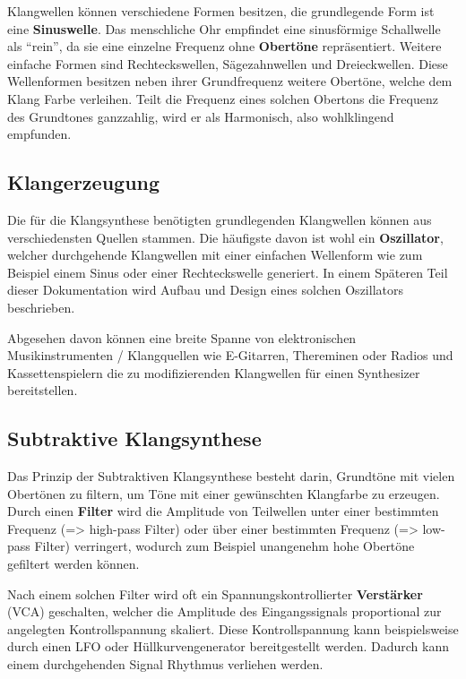 Klangwellen können verschiedene Formen besitzen, die grundlegende Form ist eine \textbf{Sinuswelle}. Das menschliche Ohr empfindet eine sinusförmige Schallwelle als "`rein"', da sie eine einzelne Frequenz ohne \textbf{Obertöne} repräsentiert. Weitere einfache Formen sind Rechteckswellen, Sägezahnwellen und Dreieckwellen. Diese Wellenformen besitzen neben ihrer Grundfrequenz weitere Obertöne, welche dem Klang Farbe verleihen. Teilt die Frequenz eines solchen Obertons die Frequenz des Grundtones ganzzahlig, wird er als Harmonisch, also wohlklingend empfunden.

\subsection{Klangerzeugung}
\label{sec:orgbae9342}
Die für die Klangsynthese benötigten grundlegenden Klangwellen können aus verschiedensten Quellen stammen. Die häufigste davon ist wohl ein \textbf{Oszillator}, welcher durchgehende Klangwellen mit einer einfachen Wellenform wie zum Beispiel einem Sinus oder einer Rechteckswelle generiert. In einem Späteren Teil dieser Dokumentation wird Aufbau und Design eines solchen Oszillators beschrieben.

Abgesehen davon können eine breite Spanne von elektronischen Musikinstrumenten / Klangquellen wie E-Gitarren, Thereminen oder Radios und Kassettenspielern die zu modifizierenden Klangwellen für einen Synthesizer bereitstellen.

\subsection{Subtraktive Klangsynthese}
\label{sec:org87528e1}
Das Prinzip der Subtraktiven Klangsynthese besteht darin, Grundtöne mit vielen Obertönen zu filtern, um Töne mit einer gewünschten Klangfarbe zu erzeugen. Durch einen \textbf{Filter} wird die Amplitude von Teilwellen unter einer bestimmten Frequenz (=> high-pass Filter) oder über einer bestimmten Frequenz (=> low-pass Filter) verringert, wodurch zum Beispiel unangenehm hohe Obertöne gefiltert werden können.

Nach einem solchen Filter wird oft ein Spannungskontrollierter \textbf{Verstärker} (VCA) geschalten, welcher die Amplitude des Eingangssignals proportional zur angelegten Kontrollspannung skaliert. Diese Kontrollspannung kann beispielsweise durch einen LFO oder Hüllkurvengenerator bereitgestellt werden. Dadurch kann einem durchgehenden Signal Rhythmus verliehen werden.

